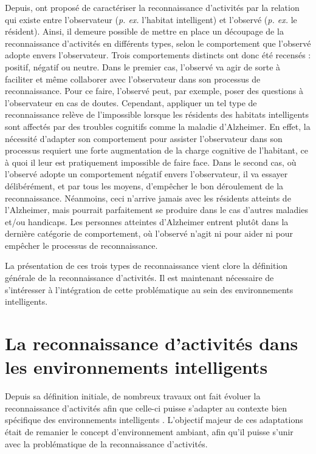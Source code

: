 {{Depuis, \cite{Roy2013} ont proposé de caractériser la reconnaissance d'activités par la relation qui existe entre l'observateur (\textit{p. ex.} l'habitat intelligent) et l'observé (\textit{p. ex.} le résident). Ainsi, il demeure possible de mettre en place un découpage de la reconnaissance d'activités en différents types, selon le comportement que l'observé adopte envers l'observateur. Trois comportements distincts ont donc été recensés : positif, négatif ou neutre. Dans le premier cas, l'observé va agir de sorte à faciliter et même collaborer avec l'observateur dans son processus de reconnaissance. Pour ce faire, l'observé peut, par exemple, poser des questions à l'observateur en cas de doutes. Cependant, appliquer un tel type de reconnaissance relève de l'impossible lorsque les résidents des habitats intelligents sont affectés par des troubles cognitifs comme la maladie d'Alzheimer. En effet, la nécessité d'adapter son comportement pour assister l'observateur dans son processus requiert une forte augmentation de la charge cognitive de l'habitant, ce à quoi il leur est pratiquement impossible de faire face. Dans le second cas, où l'observé adopte un comportement négatif envers l'observateur, il va essayer délibérément, et par tous les moyens, d'empêcher le bon déroulement de la reconnaissance. Néanmoins, ceci n'arrive jamais avec les résidents atteints de l'Alzheimer, mais pourrait parfaitement se produire dans le cas d'autres maladies et/ou handicaps. Les personnes atteintes d'Alzheimer entrent plutôt dans la dernière catégorie de comportement, où l'observé n'agit ni pour aider ni pour empêcher le processus de reconnaissance.

La présentation de ces trois types de reconnaissance vient clore la définition générale de la reconnaissance d'activités. Il est maintenant nécessaire de s'intéresser à l'intégration de cette problématique au sein des environnements intelligents.

\section{La reconnaissance d'activités dans les environnements intelligents}

Depuis sa définition initiale, de nombreux travaux ont fait évoluer la reconnaissance d'activités afin que celle-ci puisse s'adapter au contexte bien spécifique des environnements intelligents \citep{Patterson2005, Boger2006, Bouchard2007, Ghayvat2018}. L'objectif majeur de ces adaptations était de remanier le concept d'environnement ambiant, afin qu'il puisse s'unir avec la problématique de la reconnaissance d'activités.

}}

